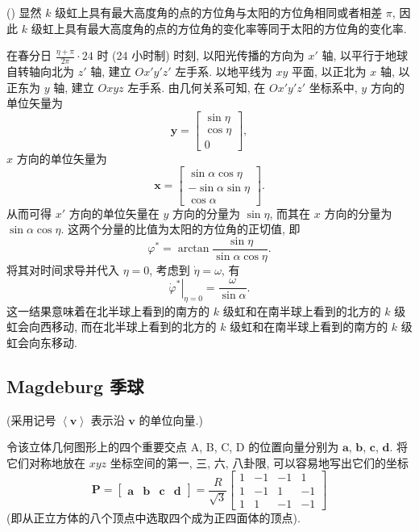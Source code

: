 \documentclass{article}
\newcounter{para}
\newcommand\mypara{\par\refstepcounter{para}(\thepara)\space}
\begin{document}
\mypara
显然 $k$ 级虹上具有最大高度角的点的方位角与太阳的方位角相同或者相差 $\pi$, 因此 $k$ 级虹上具有最大高度角的点的方位角的变化率等同于太阳的方位角的变化率.

在春分日 $\frac{\eta+\pi}{2\pi}\cdot 24$ 时 (24 小时制) 时刻, 以阳光传播的方向为 $x'$ 轴, 以平行于地球自转轴向北为 $z'$ 轴, 建立 $Ox'y'z'$ 左手系.
以地平线为 $xy$ 平面, 以正北为 $x$ 轴, 以正东为 $y$ 轴, 建立 $Oxyz$ 左手系.
由几何关系可知, 在 $Ox'y'z'$ 坐标系中, $y$ 方向的单位矢量为
\begin{equation}
	\mathbf y=\left[\begin{matrix}\sin\eta \\ \cos\eta \\ 0\end{matrix}\right],
\end{equation}
$x$ 方向的单位矢量为
\begin{equation}
	\mathbf x=\left[\begin{matrix}\sin\alpha\cos\eta \\ -\sin\alpha\sin\eta \\ \cos\alpha\end{matrix}\right].
\end{equation}
从而可得 $x'$ 方向的单位矢量在 $y$ 方向的分量为 $\sin\eta$, 而其在 $x$ 方向的分量为 $\sin\alpha\cos\eta$.
这两个分量的比值为太阳的方位角的正切值, 即
\begin{equation}
	\varphi^*=\arctan\frac{\sin\eta}{\sin\alpha\cos\eta}.
	\label{eq:太阳的方位角}
\end{equation}
将其对时间求导并代入 $\eta=0$, 考虑到 $\dot\eta=\omega$, 有
\begin{equation}
	\left.\dot\varphi^*\right|_{\eta=0}=\frac\omega{\sin\alpha}.
\end{equation}
这一结果意味着在北半球上看到的南方的 $k$ 级虹和在南半球上看到的北方的 $k$ 级虹会向西移动, 而在北半球上看到的北方的 $k$ 级虹和在南半球上看到的南方的 $k$ 级虹会向东移动.

\subsection{Magdeburg 季球}
(采用记号 $\left<\mathbf v\right>$ 表示沿 $\mathbf v$ 的单位向量.)

令该立体几何图形上的四个重要交点 A, B, C, D 的位置向量分别为
$\mathbf a$, $\mathbf b$, $\mathbf c$, $\mathbf d$.
将它们对称地放在 $xyz$ 坐标空间的第一, 三, 六, 八卦限, 可以容易地写出它们的坐标
\begin{equation}
	\mathbf P=\left[\begin{matrix}\mathbf a & \mathbf b & \mathbf c & \mathbf d\end{matrix}\right]
	=\frac R{\sqrt3}\left[\begin{matrix}1 & -1 & -1 & 1 \\ 1 & -1 & 1 & -1 \\ 1 & 1 & -1 & -1\end{matrix}\right]
\end{equation}
(即从正立方体的八个顶点中选取四个成为正四面体的顶点).
\end{document}
